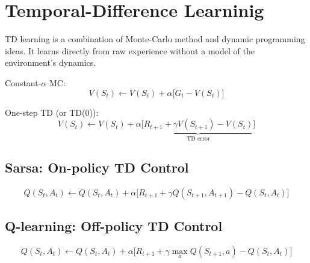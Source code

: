 \section{Temporal-Difference Learninig}

TD learning is a combination of Monte-Carlo method and dynamic programming ideas. It learns directly from raw experience without a model of the environment's dynamics. 


Constant-$\alpha$ MC:
$$V(S_t) \leftarrow V(S_t)+ \alpha \Big[G_t-V(S_t)\Big] $$

One-step TD (or TD(0)):
$$V(S_t) \leftarrow V(S_t)+ \alpha \Big[\underbrace{R_{t+1}+\gamma V(S_{t+1})-V(S_t)}_{\text{TD error}}\Big] $$

\subsection{Sarsa: On-policy TD Control}
$$Q(S_t, A_t) \leftarrow Q(S_t, A_t)+ \alpha \Big[R_{t+1}+\gamma Q(S_{t+1}, A_{t+1})-Q(S_t, A_t)\Big] $$


\subsection{Q-learning: Off-policy TD Control}

$$Q(S_t, A_t) \leftarrow Q(S_t, A_t)+ \alpha \Big[R_{t+1}+\gamma \max_a Q(S_{t+1}, a)-Q(S_t, A_t)\Big] $$

